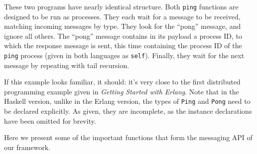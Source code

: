 \documentclass[preprint]{sigplanconf}
\begin{document}
These two programs have nearly identical structure. Both \texttt{ping} functions are designed to be run as processes. They each wait for a message to be received, matching incoming messages by type. They look for the ``pong'' message, and ignore all others. The ``pong'' message contains in its payload a process ID, to which the response message is sent, this time containing the process ID of the \texttt{ping} process (given in both languages as \texttt{self}). Finally, they wait for the next message by repeating with tail recursion.

If this example looks familiar, it should: it's very close to the first distributed programming example given in {\em Getting Started with Erlang}. Note that in the Haskell version, unlike in the Erlang version, the types of \texttt{Ping} and \texttt{Pong} need to be declared explicitly. As given, they are incomplete, as the instance declarations have been omitted for brevity.

Here we present some of the important functions that form the messaging API of our framework.
\end{document}
